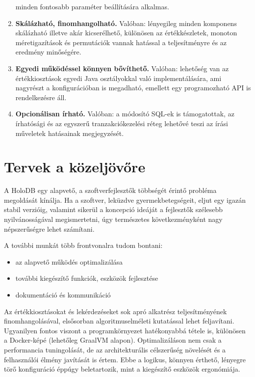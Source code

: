 \documentclass[
    parspace,
    noindent,
    nohyp,
]{elteiktdk}[2023/04/10]
\begin{document}
\begin{enumerate}
          minden fontosabb paraméter beállítására alkalmas.
    \item \textbf{Skálázható, finomhangolható.} Valóban:
          lényegileg minden komponens skálázható illetve akár kicserélhető,
          különösen az értékkészletek, monoton méretigazítások és permutációk
          vannak hatással a teljesítményre és az eredmény minőségére.
    \item \textbf{Egyedi működéssel könnyen bővíthető.} Valóban:
          lehetőség van az értékkiosztások egyedi Java osztályokkal való implementálására,
          ami nagyrészt a konfigurációban is megadható,
          emellett egy programozható API is rendelkezésre áll.
    \item \textbf{Opcionálisan írható.} Valóban:
          a módosító SQL-ek is támogatottak,
          az írhatósági és az egyszerű tranzakciókezelési réteg
          lehetővé teszi az írási műveletek hatásainak megjegyzését.
\end{enumerate}


\section{Tervek a közeljövőre}

A HoloDB egy alapvető, a szoftverfejlesztők többségét érintő probléma megoldását kínálja.
Ha a szoftver, leküzdve gyermekbetegségeit, eljut egy igazán stabil verzióig,
valamint sikerül a koncepció ideáját a fejlesztők szélesebb nyilvánosságával megismertetni,
úgy természetes következményként nagy népszerűségre lehet számítani.

A további munkát több frontvonalra tudom bontani:

\begin{itemize}
    \item az alapvető működés optimalizálása
    \item további kiegészítő funkciók, eszközök fejlesztése
    \item dokumentáció és kommunikáció
\end{itemize}

Az értékkiosztásokat és lekérdezéseket sok apró alkatrész teljesítményének finomhangolásával,
elsősorban algoritmuselméleti kutatással lehet feljavítani.
Ugyanilyen fontos viszont a programkörnyezet hatékonyabbá tétele is,
különösen a Docker-képé (lehetőleg GraalVM alapon).
Optimalizáláson nem csak a performancia tuningolását,
de az architekturális célszerűség növelését és a felhasználói élmény javítását is értem.
Ebbe a logikus, könnyen érthető, lényegre törő konfiguráció éppúgy beletartozik,
mint a kiegészítő eszközök ergonómiája.
\end{document}
